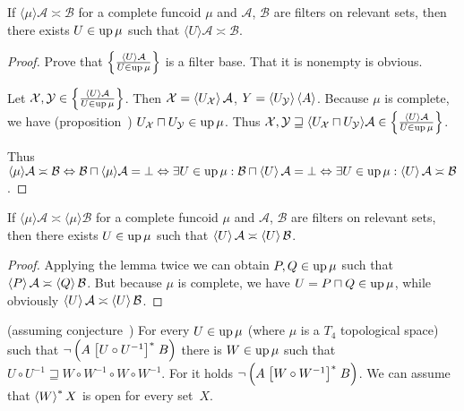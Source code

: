 \begin{lem}
  If $\langle \mu \rangle \mathcal{A} \asymp \mathcal{B}$ for a complete
  funcoid $\mu$ and $\mathcal{A}$, $\mathcal{B}$ are filters on relevant
  sets, then there exists $U \in \operatorname{up} \mu$ such that $\langle U
  \rangle \mathcal{A} \asymp \mathcal{B}$.
\end{lem}

\begin{proof}
  Prove that $\left\{ \frac{ \left\langle U\right\rangle \mathcal{A} }{
  U \in \operatorname{up} \mu }\right\}$ is a filter base. That it
  is nonempty is obvious.
  
  Let $\mathcal{X}, \mathcal{Y} \in \left\{ \frac{ \left\langle U\right\rangle \mathcal{A}
  }{ U \in \operatorname{up} \mu }\right\}$. Then
  $\mathcal{X} = \left\langle U_{\mathcal{X}}\right\rangle \mathcal{A}$, $Y = \left\langle 
  U_{\mathcal{Y}}\right\rangle \left\langle A\right\rangle$. Because $\mu$ is complete, we have
  (proposition~) $U_{\mathcal{X}} \sqcap U_{\mathcal{Y}} \in \operatorname{up}
  \mu$. Thus $\mathcal{X}, \mathcal{Y} \sqsupseteq \langle
  U_{\mathcal{X}} \sqcap U_{\mathcal{Y}} \rangle \mathcal{A} \in \left\{ \frac{
  \left\langle U\right\rangle \mathcal{A} }{ U \in \operatorname{up} \mu }\right\}$.
  
  Thus $\langle \mu \rangle \mathcal{A} \asymp \mathcal{B}
  \Leftrightarrow \mathcal{B} \sqcap \langle \mu \rangle \mathcal{A} =
  \bot \Leftrightarrow \exists U \in \operatorname{up} \mu: \mathcal{B} \sqcap
  \left\langle U\right\rangle \mathcal{A} = \bot \Leftrightarrow \exists U \in \operatorname{up}
  \mu: \left\langle U\right\rangle \mathcal{A} \asymp \mathcal{B}$.
\end{proof}

\begin{cor}\label{disj-mu}
  If $\langle \mu \rangle \mathcal{A} \asymp \langle \mu \rangle
  \mathcal{B}$ for a complete funcoid $\mu$ and $\mathcal{A}$,
  $\mathcal{B}$ are filters on relevant sets, then there exists $U \in
  \operatorname{up} \mu$ such that $\left\langle U\right\rangle \mathcal{A} \asymp \left\langle U\right\rangle \mathcal{B}$.
\end{cor}

\begin{proof}
  Applying the lemma twice we can obtain $P, Q \in \operatorname{up} \mu$
  such that $\left\langle P\right\rangle \mathcal{A} \asymp \left\langle Q\right\rangle \mathcal{B}$. But because
  $\mu$ is complete, we have $U = P \sqcap Q \in \operatorname{up} \mu$,
  while obviously $\left\langle U\right\rangle \mathcal{A} \asymp \left\langle U\right\rangle \mathcal{B}$.
\end{proof}

\begin{lem}
  (assuming conjecture~) For every $U \in \operatorname{up} \mu$ (where $\mu$ is a $T_4$ topological space) such that
  $\neg \left( A \mathrel{\left[U \circ U^{- 1}\right]^{\ast}} B \right)$ there is $W \in
  \operatorname{up} \mu$ such that $U \circ U^{- 1} \sqsupseteq W \circ W^{- 1}
  \circ W \circ W^{- 1}$. For it holds $\neg \left( A \mathrel{\left[W \circ W^{-
  1}\right]^{\ast}} B \right)$.
  We can assume that $\left\langle W\right\rangle ^{\ast}X$ is open for every set~$X$.
\end{lem}

